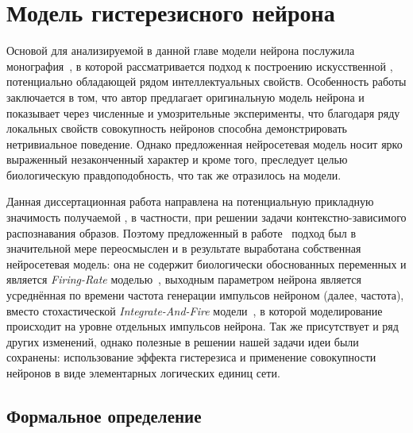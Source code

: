 \chapter{Модель гистерезисного нейрона} \label{chapter:neuron}

Основой для анализируемой в данной главе модели нейрона послужила монография~\cite{EmelyanovYaroslavsky1990}, в которой рассматривается подход к построению искусственной , потенциально обладающей рядом интеллектуальных свойств. Особенность работы заключается в том, что автор предлагает оригинальную модель нейрона и показывает через численные и умозрительные эксперименты, что благодаря ряду локальных свойств совокупность нейронов способна демонстрировать нетривиальное поведение. Однако предложенная нейросетевая модель носит ярко выраженный незаконченный характер и кроме того, преследует целью биологическую правдоподобность, что так же отразилось на модели.

Данная диссертационная работа направлена на потенциальную прикладную значимость получаемой , в частности, при решении задачи контекстно-зависимого распознавания образов. Поэтому предложенный в работе~\cite{EmelyanovYaroslavsky1990} подход был в значительной мере переосмыслен и в результате выработана собственная нейросетевая модель: она не содержит биологически обоснованных переменных и является \socalled \textit{Firing-Rate} моделью~\cite{Dayan2001}, \ie выходным параметром нейрона является усреднённая по времени частота генерации импульсов нейроном (далее, частота), вместо \socalled стохастической \textit{Integrate-And-Fire} модели~\cite{Dayan2001}, в которой моделирование происходит на уровне отдельных импульсов нейрона. Так же присутствует и ряд других изменений, однако полезные в решении нашей задачи идеи были сохранены: использование эффекта гистерезиса и применение совокупности нейронов в виде элементарных логических единиц сети.

\section{Формальное определение} \label{section:neuron_model}

